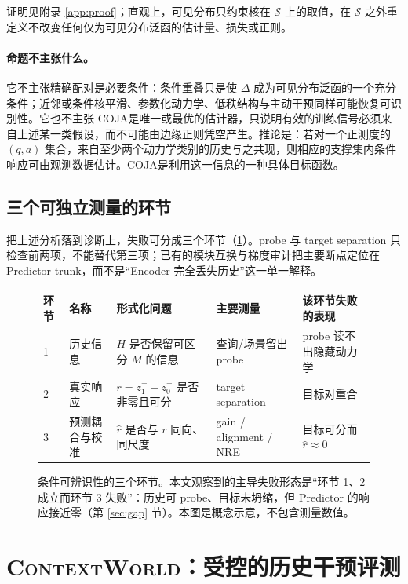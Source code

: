 \documentclass[UTF8,zihao=-4,fontset=fandol]{ctexart}
\renewcommand{\arraystretch}{1.18}
\newcommand{\method}{\textsc{COJA}}
\newcommand{\benchmark}{\textsc{ContextWorld}}
\begin{document}
证明见附录 \ref{app:proof}；直观上，可见分布只约束核在 $\mathcal{S}$ 上的取值，在 $\mathcal{S}$ 之外重定义不改变任何仅为可见分布泛函的估计量、损失或正则。

\paragraph{命题不主张什么。}
它不主张精确配对是必要条件：条件重叠只是使 $\Delta$ 成为可见分布泛函的一个充分条件；近邻或条件核平滑、参数化动力学、低秩结构与主动干预同样可能恢复可识别性。它也不主张 \method 是唯一或最优的估计器，只说明有效的训练信号必须来自上述某一类假设，而不可能由边缘正则凭空产生。推论是：若对一个正测度的 $(q,a)$ 集合，来自至少两个动力学类别的历史与之共现，则相应的支撑集内条件响应可由观测数据估计。\method 是利用这一信息的一种具体目标函数。

\subsection{三个可独立测量的环节}

把上述分析落到诊断上，失败可分成三个环节（\cref{fig:threelinks}）。probe 与 target separation 只检查前两项，不能替代第三项；已有的模块互换与梯度审计把主要断点定位在 Predictor trunk，而不是“Encoder 完全丢失历史”这一单一解释。

\begin{figure}[t]
\centering
\footnotesize
\setlength{\tabcolsep}{5pt}
\renewcommand{\arraystretch}{1.25}
\begin{tabular}{@{}p{1.05cm}p{2.6cm}p{4.2cm}p{3.2cm}p{3.4cm}@{}}
\toprule
环节 & 名称 & 形式化问题 & 主要测量 & 该环节失败的表现 \\
\midrule
1 & 历史信息 & $H$ 是否保留可区分 $M$ 的信息 & 查询/场景留出 probe & probe 读不出隐藏动力学 \\
2 & 真实响应 & $r=z_1^+-z_0^+$ 是否非零且可分 & target separation & 目标对重合 \\
3 & 预测耦合与校准 & $\hat r$ 是否与 $r$ 同向、同尺度 & gain / alignment / NRE & 目标可分而 $\hat r\approx 0$ \\
\bottomrule
\end{tabular}
\caption{条件可辨识性的三个环节。本文观察到的主导失败形态是“环节 1、2 成立而环节 3 失败”：历史可 probe、目标未坍缩，但 Predictor 的响应接近零（第 \ref{sec:gap} 节）。本图是概念示意，不包含测量数值。}
\label{fig:threelinks}
\end{figure}

\section{\benchmark：受控的历史干预评测}
\label{sec:benchmark}
\end{document}

